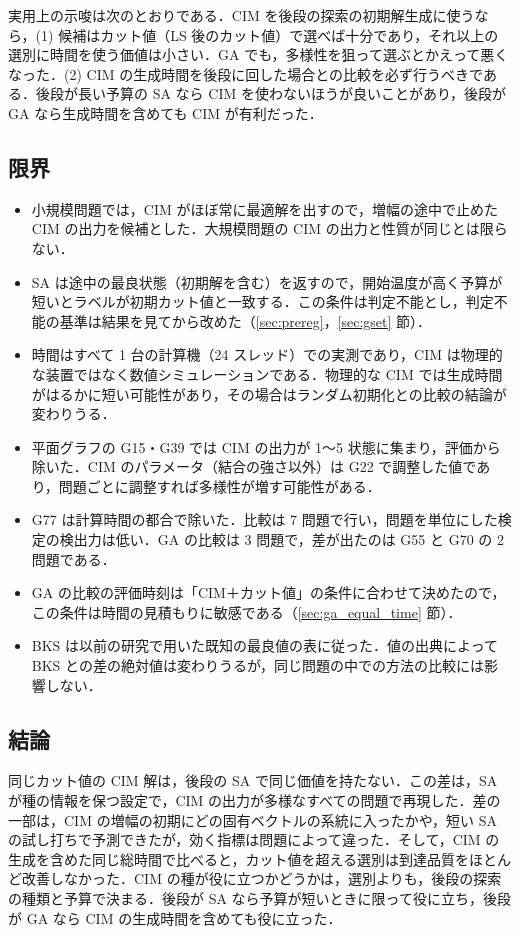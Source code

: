 実用上の示唆は次のとおりである．CIM を後段の探索の初期解生成に使うなら，(1) 候補はカット値（LS 後のカット値）で選べば十分であり，それ以上の選別に時間を使う価値は小さい．GA でも，多様性を狙って選ぶとかえって悪くなった．(2) CIM の生成時間を後段に回した場合との比較を必ず行うべきである．後段が長い予算の SA なら CIM を使わないほうが良いことがあり，後段が GA なら生成時間を含めても CIM が有利だった．

\subsection{限界}

\begin{itemize}
  \item 小規模問題では，CIM がほぼ常に最適解を出すので，増幅の途中で止めた CIM の出力を候補とした．大規模問題の CIM の出力と性質が同じとは限らない．
  \item SA は途中の最良状態（初期解を含む）を返すので，開始温度が高く予算が短いとラベルが初期カット値と一致する．この条件は判定不能とし，判定不能の基準は結果を見てから改めた（\ref{sec:prereg}，\ref{sec:gset} 節）．
  \item 時間はすべて 1 台の計算機（24 スレッド）での実測であり，CIM は物理的な装置ではなく数値シミュレーションである．物理的な CIM では生成時間がはるかに短い可能性があり，その場合はランダム初期化との比較の結論が変わりうる．
  \item 平面グラフの G15・G39 では CIM の出力が 1〜5 状態に集まり，評価から除いた．CIM のパラメータ（結合の強さ以外）は G22 で調整した値であり，問題ごとに調整すれば多様性が増す可能性がある．
  \item G77 は計算時間の都合で除いた．比較は 7 問題で行い，問題を単位にした検定の検出力は低い．GA の比較は 3 問題で，差が出たのは G55 と G70 の 2 問題である．
  \item GA の比較の評価時刻は「CIM＋カット値」の条件に合わせて決めたので，この条件は時間の見積もりに敏感である（\ref{sec:ga_equal_time} 節）．
  \item BKS は以前の研究で用いた既知の最良値の表に従った．値の出典によって BKS との差の絶対値は変わりうるが，同じ問題の中での方法の比較には影響しない．
\end{itemize}

\subsection{結論}

同じカット値の CIM 解は，後段の SA で同じ価値を持たない．この差は，SA が種の情報を保つ設定で，CIM の出力が多様なすべての問題で再現した．差の一部は，CIM の増幅の初期にどの固有ベクトルの系統に入ったかや，短い SA の試し打ちで予測できたが，効く指標は問題によって違った．そして，CIM の生成を含めた同じ総時間で比べると，カット値を超える選別は到達品質をほとんど改善しなかった．CIM の種が役に立つかどうかは，選別よりも，後段の探索の種類と予算で決まる．後段が SA なら予算が短いときに限って役に立ち，後段が GA なら CIM の生成時間を含めても役に立った．
